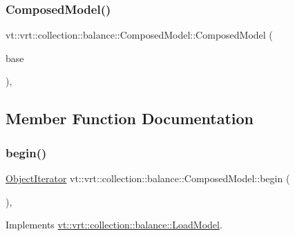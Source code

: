 \subsubsection{\texorpdfstring{Composed\+Model()}{ComposedModel()}}
{\footnotesize\ttfamily vt\+::vrt\+::collection\+::balance\+::\+Composed\+Model\+::\+Composed\+Model (\begin{DoxyParamCaption}\item[{std\+::shared\+\_\+ptr$<$ \hyperlink{classvt_1_1vrt_1_1collection_1_1balance_1_1_load_model}{Load\+Model} $>$}]{base }\end{DoxyParamCaption})\hspace{0.3cm}{\ttfamily [inline]}, {\ttfamily [explicit]}}



\subsection{Member Function Documentation}
\mbox{\label{classvt_1_1vrt_1_1collection_1_1balance_1_1_composed_model_a8f34205887c08a22a1e5bef6ee358f2b}} 
\subsubsection{\texorpdfstring{begin()}{begin()}}
{\footnotesize\ttfamily \hyperlink{classvt_1_1vrt_1_1collection_1_1balance_1_1_object_iterator}{Object\+Iterator} vt\+::vrt\+::collection\+::balance\+::\+Composed\+Model\+::begin (\begin{DoxyParamCaption}{ }\end{DoxyParamCaption})\hspace{0.3cm}{\ttfamily [override]}, {\ttfamily [virtual]}}



Implements \hyperlink{classvt_1_1vrt_1_1collection_1_1balance_1_1_load_model_a6ca139b4f14d79d1d59b46016efae221}{vt\+::vrt\+::collection\+::balance\+::\+Load\+Model}.

\mbox{\label{classvt_1_1vrt_1_1collection_1_1balance_1_1_composed_model_a23ca95221c6bffb7417aafa2c939b40a}} 
